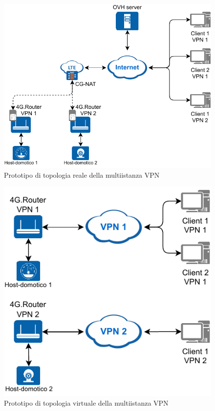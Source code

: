 
\begin{figure}
    \centering
    \includegraphics[width=0.8\linewidth]{immagini/diag2-multiistanza_real}
    \caption{Prototipo di topologia reale della multiistanza VPN}
    \label{fig:diag2-multiistanza_real}
\end{figure}

\begin{figure}
    \centering
    \includegraphics[width=0.6\linewidth]{immagini/diag2-multiistanza_virtual}
    \caption{Prototipo di topologia virtuale della multiistanza VPN}
    \label{fig:diag2-multiistanza_virtual}
\end{figure}





